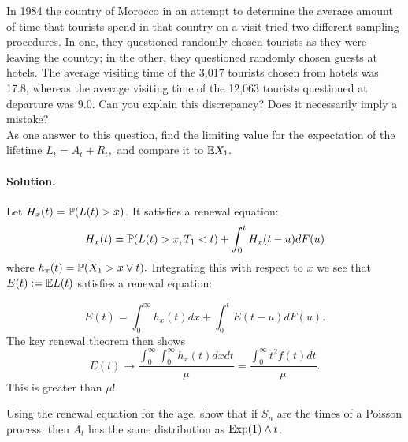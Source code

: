\documentclass[12pt]{article}
\begin{document}
\begin{exercise}
In 1984 the country of Morocco in an attempt to determine the average amount of time that tourists spend in that country on a visit tried two different sampling procedures.
In one, they questioned randomly chosen tourists as they were leaving the country; in the other, they questioned randomly chosen guests at hotels. The average visiting time of the 3,017 tourists chosen from hotels was 17.8, whereas the average visiting time of the 12,063 tourists
questioned at departure was 9.0. Can you explain this discrepancy? Does it necessarily imply
a mistake? \\

As one answer to this question, find the limiting value for the expectation of the lifetime $L_t = A_t + R_t,$ and compare it to $\mathbb{E} X_1.$ 

\paragraph{Solution.} Let $H_x(t) = \mathbb{P}(L(t) > x)$. It satisfies a renewal equation:
\[
H_x(t) = \mathbb{P}(L(t) > x, T_1 <t) + \int_0^t H_x(t-u) dF(u)
\]
where $h_x(t) = \mathbb{P}(X_1 > x \vee t).$ Integrating this with respect to $x$ we see that $E(t) := \mathbb{E} L(t)$ satisfies a renewal equation:

\[
E(t) = \int_0^\infty h_x(t) dx + \int_0^t E(t-u) dF(u).
\]
The key renewal theorem then shows
\[
E(t) \rightarrow \frac{\int_0^\infty \int_0^{\infty}h_x(t) dx dt}{\mu} = \frac{\int_0^\infty t^2 f(t) dt}{\mu}.
\]
This is greater than $\mu!$

\end{exercise}

\begin{exercise}
Using the renewal equation for the age, show that if $S_n$ are the times of a Poisson process, then $A_t$ has the same distribution as $\operatorname{Exp}(1) \wedge t$. 
\end{exercise}
\end{document}
